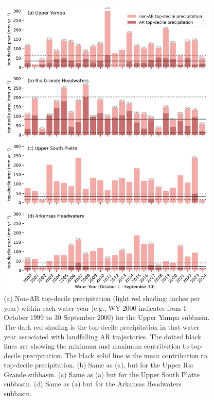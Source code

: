 \documentclass[draft]{agujournal2019}
\begin{document}
\begin{figure}
\noindent\includegraphics[width=\textwidth, height=\textheight, keepaspectratio]{fig10.png}

\caption{(a) Non-AR top-decile precipitation (light red shading; inches per year) within each water year (e.g., WY 2000 indicates from 1 October 1999 to 30 September 2000) for the Upper Yampa subbasin. The dark red shading is the top-decile precipitation in that water year associated with landfalling AR trajectories. The dotted black lines are showing the minimum and maximum contribution to top-decile precipitation. The black solid line is the mean contribution to top-decile precipitation. (b) Same as (a), but for the Upper Rio Grande subbasin. (c) Same as (a) but for the Upper South Platte subbasin. (d) Same as (a) but for the Arkansas Headwaters subbasin.}
\label{fig:time_series}
\end{figure}
\end{document}
